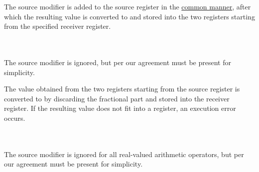 The source modifier is added to the source register in
the \hyperlink{types:twos_complement}{common manner}, after which the resulting
 value is converted to  and stored into the two registers
starting from the specified receiver register.

\vspace{-0.35cm}
\paragraph{}\

The source modifier is ignored, but per our agreement must be present for
simplicity.

The  value obtained from the two registers starting from the source
register is converted to  by discarding the fractional part
and stored into the receiver register.
If the resulting value does not fit into a register, an execution error occurs.

\vspace{-0.35cm}
\paragraph{}\

The source modifier is ignored for all real-valued arithmetic operators,
but per our agreement must be present for simplicity.
